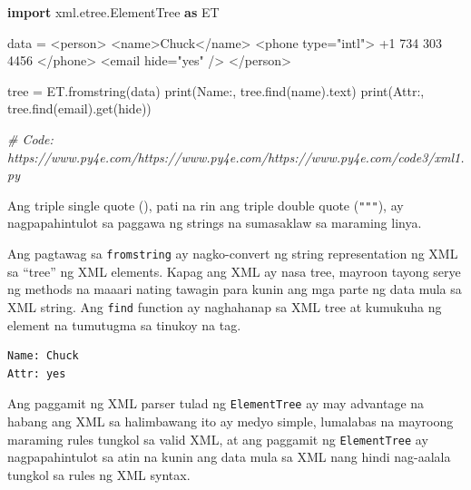 \documentclass[10pt,]{book}
\newenvironment{Shaded}{}{}
\newcommand{\BuiltInTok}[1]{\textcolor[rgb]{0.00,0.50,0.00}{#1}}
\newcommand{\CommentTok}[1]{\textcolor[rgb]{0.38,0.63,0.69}{\textit{#1}}}
\newcommand{\ImportTok}[1]{\textcolor[rgb]{0.00,0.50,0.00}{\textbf{#1}}}
\newcommand{\NormalTok}[1]{#1}
\newcommand{\OperatorTok}[1]{\textcolor[rgb]{0.40,0.40,0.40}{#1}}
\newcommand{\StringTok}[1]{\textcolor[rgb]{0.25,0.44,0.63}{#1}}
\begin{document}
\begin{Shaded}
\begin{Highlighting}[]
\ImportTok{import}\NormalTok{ xml.etree.ElementTree }\ImportTok{as}\NormalTok{ ET}

\NormalTok{data }\OperatorTok{=} \StringTok{\textquotesingle{}\textquotesingle{}\textquotesingle{}}
\StringTok{\textless{}person\textgreater{}}
\StringTok{  \textless{}name\textgreater{}Chuck\textless{}/name\textgreater{}}
\StringTok{  \textless{}phone type="intl"\textgreater{}}
\StringTok{    +1 734 303 4456}
\StringTok{  \textless{}/phone\textgreater{}}
\StringTok{  \textless{}email hide="yes" /\textgreater{}}
\StringTok{\textless{}/person\textgreater{}\textquotesingle{}\textquotesingle{}\textquotesingle{}}

\NormalTok{tree }\OperatorTok{=}\NormalTok{ ET.fromstring(data)}
\BuiltInTok{print}\NormalTok{(}\StringTok{\textquotesingle{}Name:\textquotesingle{}}\NormalTok{, tree.find(}\StringTok{\textquotesingle{}name\textquotesingle{}}\NormalTok{).text)}
\BuiltInTok{print}\NormalTok{(}\StringTok{\textquotesingle{}Attr:\textquotesingle{}}\NormalTok{, tree.find(}\StringTok{\textquotesingle{}email\textquotesingle{}}\NormalTok{).get(}\StringTok{\textquotesingle{}hide\textquotesingle{}}\NormalTok{))}

\CommentTok{\# Code: https://www.py4e.com/https://www.py4e.com/https://www.py4e.com/code3/xml1.py}
\end{Highlighting}
\end{Shaded}

Ang triple single quote
(\texttt{\textquotesingle{}\textquotesingle{}\textquotesingle{}}), pati
na rin ang triple double quote (\texttt{"""}), ay nagpapahintulot sa
paggawa ng strings na sumasaklaw sa maraming linya.

Ang pagtawag sa \texttt{fromstring} ay nagko-convert ng string
representation ng XML sa ``tree'' ng XML elements. Kapag ang XML ay nasa
tree, mayroon tayong serye ng methods na maaari nating tawagin para
kunin ang mga parte ng data mula sa XML string. Ang \texttt{find}
function ay naghahanap sa XML tree at kumukuha ng element na tumutugma
sa tinukoy na tag.

{\small
\begin{verbatim}
Name: Chuck
Attr: yes
\end{verbatim}
}

Ang paggamit ng XML parser tulad ng \texttt{ElementTree} ay may
advantage na habang ang XML sa halimbawang ito ay medyo simple,
lumalabas na mayroong maraming rules tungkol sa valid XML, at ang
paggamit ng \texttt{ElementTree} ay nagpapahintulot sa atin na kunin ang
data mula sa XML nang hindi nag-aalala tungkol sa rules ng XML syntax.
\end{document}
